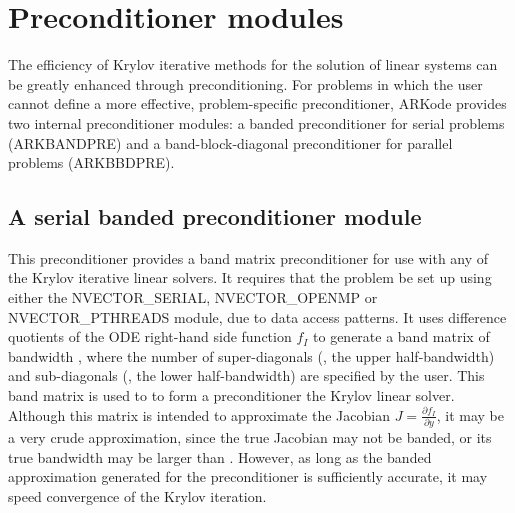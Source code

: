 \documentclass[letterpaper,10pt,english]{sphinxmanual}
\begin{document}
\section{Preconditioner modules}
\label{c_interface/Preconditioners::doc}\label{c_interface/Preconditioners:cinterface-preconditionermodules}\label{c_interface/Preconditioners:preconditioner-modules}
The efficiency of Krylov iterative methods for the solution of linear
systems can be greatly enhanced through preconditioning.  For problems
in which the user cannot define a more effective, problem-specific
preconditioner, ARKode provides two internal preconditioner modules:
a banded preconditioner for serial problems (ARKBANDPRE) and a
band-block-diagonal preconditioner  for parallel problems (ARKBBDPRE).


\subsection{A serial banded preconditioner module}
\label{c_interface/Preconditioners:cinterface-bandpre}\label{c_interface/Preconditioners:a-serial-banded-preconditioner-module}
This preconditioner provides a band matrix preconditioner for use with
any of the Krylov iterative linear solvers.  It requires that the
problem be set up using either the NVECTOR\_SERIAL, NVECTOR\_OPENMP or
NVECTOR\_PTHREADS module, due to data access patterns.  It uses
difference quotients of the ODE right-hand side function $f_I$
to generate a band matrix of bandwidth , where the
number of super-diagonals (, the upper half-bandwidth) and
sub-diagonals (, the lower half-bandwidth) are specified by the
user.  This band matrix is used to to form a preconditioner the Krylov
linear solver.  Although this matrix is intended to approximate the
Jacobian $J = \frac{\partial f_I}{\partial y}$, it may be a
very crude approximation, since the true Jacobian may not be banded,
or its true bandwidth may be larger than .  However, as
long as the banded approximation generated for the preconditioner is
sufficiently accurate, it may speed convergence of the Krylov
iteration.
\end{document}
